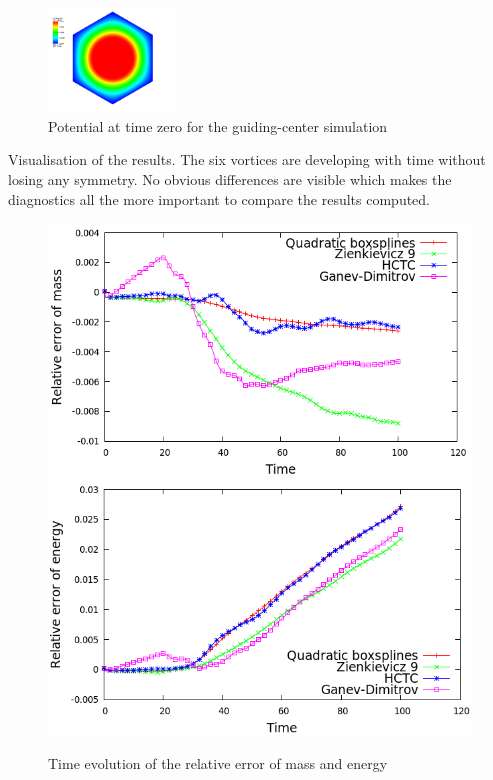 \documentclass[proc]{edpsmath}
\begin{document}
\begin{figure}[h!]
	\includegraphics[width=0.3\textwidth]{figures/gc_phi_t0.png}
	\caption{Potential at time zero for the guiding-center simulation}
	\label{phi}
\end{figure}

Visualisation of the results. The six vortices are developing with time without losing any symmetry. No obvious differences are visible which makes the diagnostics all the more important to compare the results computed.


\begin{figure}[h!]
	\includegraphics[scale=0.3]{figures/mass_cg.png}
	\includegraphics[scale=0.3]{figures/energy_cg.png}
	\caption{Time evolution of the relative error of mass and energy}
\end{figure}
\end{document}
